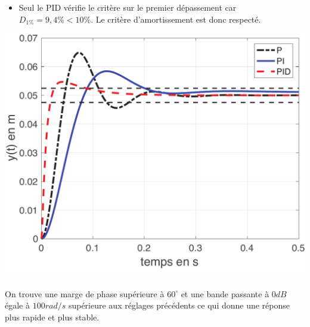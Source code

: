 \documentclass[10pt,fleqn]{article} %
\begin{document}
\begin{multicols}{2}
\begin{itemize}
\item Seul le PID vérifie le critère sur le premier dépassement car $D_{1\%}=9,4\%<10\%$. Le critère d'amortissement est
donc respecté.
\end{itemize}

\begin{center}
\includegraphics[width=0.7\linewidth]{images/matlab/rep_temp_corrige.pdf}
\end{center}

\subparagraph{}\textit{}%

On trouve une marge de phase supérieure à $60^{\circ}$ et une bande passante à $0dB$ égale à $100rad/s$ supérieure aux réglages précédents ce qui donne une réponse plus rapide et plus stable.

\end{multicols}
\end{document}
